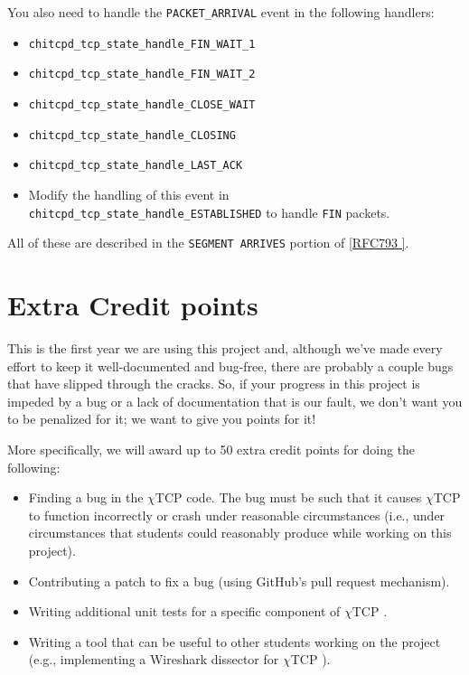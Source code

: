 \documentclass[10pt]{article}
\newcommand{\chitcp}{$\chi$\textsf{TCP} }
\newcommand{\RFCsection}[2]{\href{http://tools.ietf.org/html/rfc#1\#section-#2}{[RFC#1 \textsection #2]}}
\newcommand{\points}[1]{{\sffamily\mdseries\guillemotleft #1 points\guillemotright{}}}
\begin{document}
\begin{itemize}
 You also need to handle the \texttt{PACKET\_ARRIVAL} event in the following handlers:
 
  \begin{itemize}
  \item \texttt{chitcpd\_tcp\_state\_handle\_FIN\_WAIT\_1}
  \item \texttt{chitcpd\_tcp\_state\_handle\_FIN\_WAIT\_2}
  \item \texttt{chitcpd\_tcp\_state\_handle\_CLOSE\_WAIT}
  \item \texttt{chitcpd\_tcp\_state\_handle\_CLOSING}
  \item \texttt{chitcpd\_tcp\_state\_handle\_LAST\_ACK}
  \item Modify the handling of this event in \texttt{chitcpd\_tcp\_state\_handle\_ESTABLISHED} to handle \texttt{FIN} packets.
  \end{itemize}
  
 All of these are described in the \texttt{SEGMENT ARRIVES} portion of \RFCsection{793}{3.9}.
\end{itemize}

\section{Extra Credit \points{50}}
\label{sec:extra}

This is the first year we are using this project and, although we've made every effort to keep it well-documented and bug-free, there are probably a couple bugs that have slipped through the cracks. So, if your progress in this project is impeded by a bug or a lack of documentation that is our fault, we don't want you to be penalized for it; we want to give you points for it!

More specifically, we will award up to 50 extra credit points for doing the following:

\begin{itemize}
 \item Finding a bug in the \chitcp code. The bug must be such that it causes \chitcp to function incorrectly or crash under reasonable circumstances (i.e., under circumstances that students could reasonably produce while working on this project).
 \item Contributing a patch to fix a bug (using GitHub's pull request mechanism). 
 \item Writing additional unit tests for a specific component of \chitcp.
 \item Writing a tool that can be useful to other students working on the project (e.g., implementing a Wireshark dissector for \chitcp).
\end{itemize}
\end{document}
